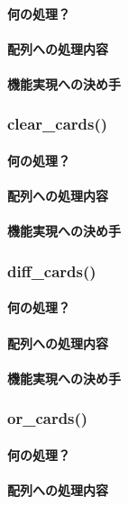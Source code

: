\documentclass[11pt,a4paper, uplatex]{jsarticle}
\begin{document}
\paragraph{何の処理？}
\paragraph{配列への処理内容}
\paragraph{機能実現への決め手}
%
\subsubsection{clear\_cards()}
\paragraph{何の処理？}
\paragraph{配列への処理内容}
\paragraph{機能実現への決め手}
%
\subsubsection{diff\_cards()}
\paragraph{何の処理？}
\paragraph{配列への処理内容}
\paragraph{機能実現への決め手}
%
\subsubsection{or\_cards()}
\paragraph{何の処理？}
\paragraph{配列への処理内容}
\end{document}

